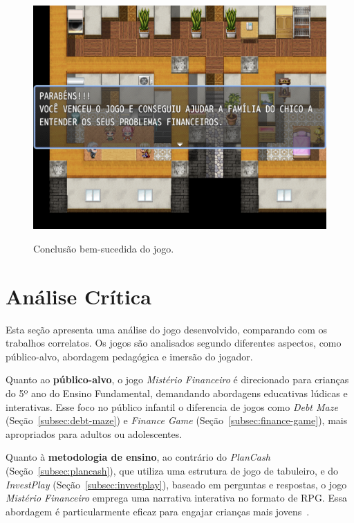 \begin{figure}[!htbp]
	\centering
	\caption{Conclusão bem-sucedida do jogo.}
	\includegraphics[scale=0.4]{Textuais/Pictures/vitoria.png}
	\label{fig:vitoria}
\end{figure}

\section{Análise Crítica}

Esta seção apresenta uma análise do jogo desenvolvido, comparando com os trabalhos correlatos. Os jogos são analisados segundo diferentes aspectos, como público-alvo, abordagem pedagógica e imersão do jogador.

Quanto ao \textbf{público-alvo}, o jogo \textit{Mistério Financeiro} é direcionado para crianças do 5º ano do Ensino Fundamental, demandando abordagens educativas lúdicas e interativas. Esse foco no público infantil o diferencia de jogos como \textit{Debt Maze} (Seção~\ref{subsec:debt-maze}) e \textit{Finance Game} (Seção~\ref{subsec:finance-game}), mais apropriados para adultos ou adolescentes.

Quanto à \textbf{metodologia de ensino}, ao contrário do \textit{PlanCash} (Seção~\ref{subsec:plancash}), que utiliza uma estrutura de jogo de tabuleiro, e do \textit{InvestPlay} (Seção~\ref{subsec:investplay}), baseado em perguntas e respostas, o jogo \textit{Mistério Financeiro} emprega uma narrativa interativa no formato de RPG. Essa abordagem é particularmente eficaz para engajar crianças mais jovens~\cite{liu2017intelligent}.


